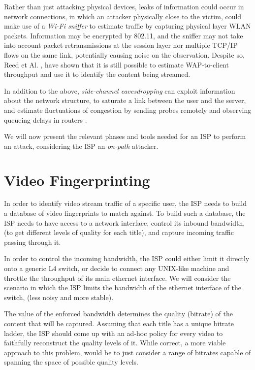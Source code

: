 Rather than just attacking physical devices, leaks of information could occur
in network connections, in which an attacker physically close to the victim,
could make use of a \emph{Wi-Fi sniffer} to estimate traffic by capturing
physical layer WLAN packets.  Information may be encrypted by 802.11, and the
sniffer may not take into account packet retransmissions at the session layer
nor multiple TCP/IP flows on the same link, potentially causing noise on the
observation. Despite so, Reed et Al. \cite{leaky_streams}, have shown that it
is still possible to estimate WAP-to-client throughput and use it to identify
the content being streamed.

In addition to the above, \emph{side-channel eavesdropping} can exploit
information about the network structure, to saturate a link between the user
and the server, and estimate fluctuations of congestion by sending probes
remotely and observing queueing delays in routers \cite{side_channel}. 

We will now present the relevant phases and tools needed for an ISP to perform
an attack, considering the ISP an \emph{on-path} attacker.

\section{Video Fingerprinting}

In order to identify video stream traffic of a specific user, the ISP needs to
build a database of video fingerprints to match against. To build such a
database, the ISP needs to have access to a network interface, control its
inbound bandwidth, (to get different levels of quality for each title), and
capture incoming traffic passing through it.

In order to control the incoming bandwidth, the ISP could either limit it
directly onto a generic L4 switch, or decide to connect
any UNIX-like machine and throttle the throughput of its main ethernet
interface. We will consider the scenario in which the ISP limits the bandwidth
of the ethernet interface of the switch, (less noisy and more stable).

The value of the enforced bandwidth determines the quality (bitrate) of the
content that will be captured. Assuming that each title has a unique bitrate
ladder, the ISP should come up with an ad-hoc policy for every video to
faithfully reconstruct the quality levels of it. While correct, a more viable
approach to this problem, would be to just consider a range of bitrates capable
of spanning the space of possible quality levels. 

